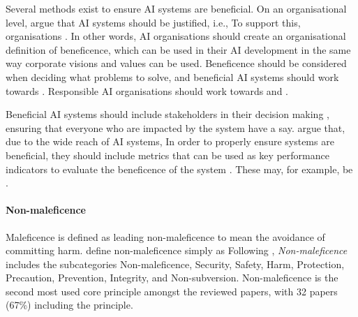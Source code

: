 Several methods exist to ensure AI systems are beneficial. On an organisational level, \textcite[p.~2151]{Morley_2020} argue that AI systems should be justified, i.e.,  To support this, organisations  \parencite[p.~9]{vanBruxvoort_2021}. In other words, AI organisations should create an organisational definition of beneficence, which can be used in their AI development in the same way corporate visions and values can be used. Beneficence should be considered when deciding what problems to solve, and beneficial AI systems should work towards  \parencite[p.~73]{Ryan_2021}. Responsible AI organisations should work towards   and  \parencite[p.~11]{Jobin_2019}.

Beneficial AI systems should include stakeholders in their decision making \parencite{Lu_2022,Havrda_2020,Morley_2020}, ensuring that everyone who are impacted by the system have a say. \textcite[p.~134]{Nevanperä_2021} argue that, due to the wide reach of AI systems,  In order to properly ensure systems are beneficial, they should include metrics that can be used as key performance indicators to evaluate the beneficence of the system \parencite{Eitel-Porter_2021}. These may, for example, be  \parencite[p.~5]{Havrda_2020}.


\paragraph{Non-maleficence}
Maleficence is defined as  leading non-maleficence to mean the avoidance of committing harm. \textcite[p.~697]{Floridi_2018} define non-maleficence simply as  Following \textcite{Ryan_2021}, \textit{Non-maleficence} includes the subcategories Non-maleficence, Security, Safety, Harm, Protection, Precaution, Prevention, Integrity, and Non-subversion. Non-maleficence is the second most used core principle amongst the reviewed papers, with 32 papers (67\%) including the principle.

